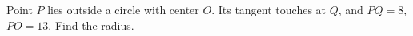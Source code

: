 Point $P$ lies outside a circle with center $O$. Its tangent touches at $Q$, and $PQ=8$, $PO=13$. Find the radius.
